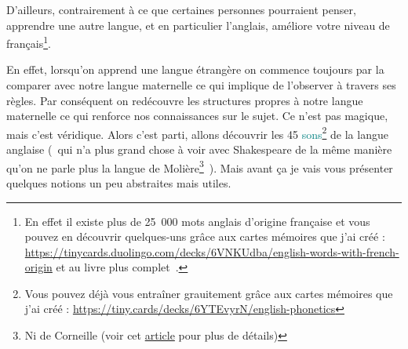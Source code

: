 D'ailleurs, contrairement à ce que certaines personnes pourraient
penser, apprendre une autre langue, et en particulier l'anglais,
améliore votre niveau de français\footnote{En effet il existe plus de
  25~000 mots anglais d'origine française et vous pouvez en découvrir
  quelques-uns grâce aux cartes mémoires que j'ai créé :   \url{https://tinycards.duolingo.com/decks/6VNKUdba/english-words-with-french-origin}
  et au livre plus complet~\cite{hw}.}.

En effet, lorsqu'on apprend une langue étrangère on commence toujours
par la comparer avec notre langue maternelle ce qui implique de
l'observer à travers ses règles. Par conséquent on redécouvre les
structures propres à notre langue maternelle ce qui renforce nos
connaissances sur le sujet. Ce n'est pas magique, mais c'est
véridique. Alors c'est parti, allons découvrir les 45
\textcolor{teal}{sons}\footnote{Vous pouvez déjà vous entraîner
  grauitement grâce aux cartes mémoires que j'ai créé : \url{https://tiny.cards/decks/6YTEvyrN/english-phonetics}}
de la langue anglaise (~qui n'a plus grand chose à voir avec 
Shakespeare de la même manière qu'on ne parle plus la langue de
Molière\footnote{Ni de Corneille (voir cet \href{https://fr.wikipedia.org/wiki/Paternit\%C3\%A9_des_\%C5\%93uvres_de_Moli\%C3\%A8re\#L'\%C3\%A9tude_statistique_de_Cyril_et_Dominique_Labb\%C3\%A9}{article} pour plus de détails)}~). Mais avant ça je vais vous présenter quelques notions un peu
abstraites mais utiles. 

\newpage
\minitoc
